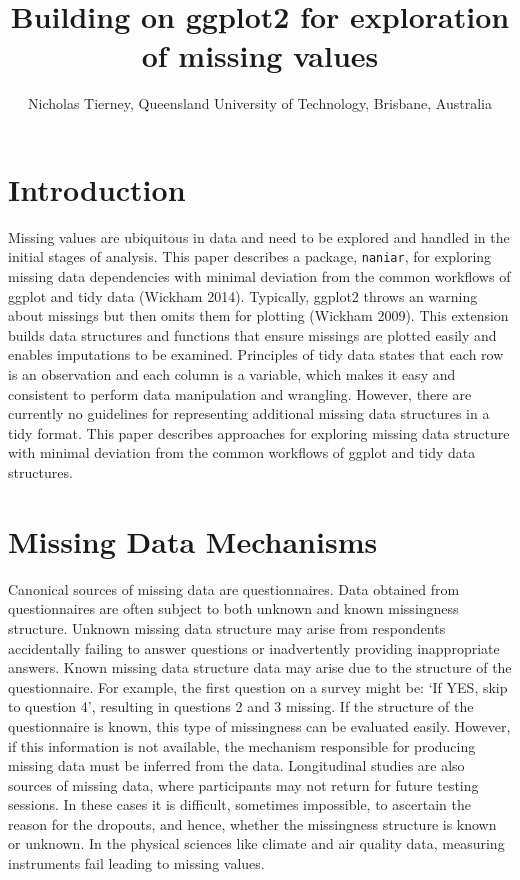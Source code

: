 \documentclass[]{article}
\title{Building on ggplot2 for exploration of missing values}
\author{Nicholas Tierney, Queensland University of Technology, Brisbane,
Australia}
\date{}
\begin{document}
\maketitle

\section{Introduction}\label{introduction}

Missing values are ubiquitous in data and need to be explored and
handled in the initial stages of analysis. This paper describes a
package, \texttt{naniar}, for exploring missing data dependencies with
minimal deviation from the common workflows of ggplot and tidy data
(Wickham 2014). Typically, ggplot2 throws an warning about missings but
then omits them for plotting (Wickham 2009). This extension builds data
structures and functions that ensure missings are plotted easily and
enables imputations to be examined. Principles of tidy data states that
each row is an observation and each column is a variable, which makes it
easy and consistent to perform data manipulation and wrangling. However,
there are currently no guidelines for representing additional missing
data structures in a tidy format. This paper describes approaches for
exploring missing data structure with minimal deviation from the common
workflows of ggplot and tidy data structures.

\section{Missing Data Mechanisms}\label{missing-data-mechanisms}

Canonical sources of missing data are questionnaires. Data obtained from
questionnaires are often subject to both unknown and known missingness
structure. Unknown missing data structure may arise from respondents
accidentally failing to answer questions or inadvertently providing
inappropriate answers. Known missing data structure data may arise due
to the structure of the questionnaire. For example, the first question
on a survey might be: `If YES, skip to question 4', resulting in
questions 2 and 3 missing. If the structure of the questionnaire is
known, this type of missingness can be evaluated easily. However, if
this information is not available, the mechanism responsible for
producing missing data must be inferred from the data. Longitudinal
studies are also sources of missing data, where participants may not
return for future testing sessions. In these cases it is difficult,
sometimes impossible, to ascertain the reason for the dropouts, and
hence, whether the missingness structure is known or unknown. In the
physical sciences like climate and air quality data, measuring
instruments fail leading to missing values.
\end{document}
